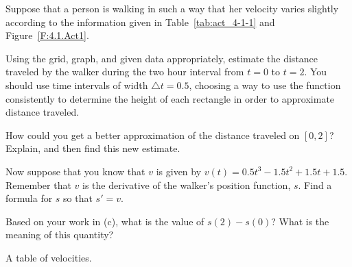 \begin{activity} \label{A:4.1.1}  Suppose that a person is walking in such a way that her velocity varies slightly according to the information given in Table~\ref{tab:act_4-1-1} and Figure~\ref{F:4.1.Act1}.
\ba
	\item Using the grid, graph, and given data appropriately, estimate the distance traveled by the walker during the two hour interval from $t = 0$ to $t = 2$.  You should use time intervals of width $\triangle t = 0.5$, choosing a way to use the function consistently to determine the height of each rectangle in order to approximate distance traveled.
	\item How could you get a better approximation of the distance traveled on $[0,2]$?  Explain, and then find this new estimate.
	\item Now suppose that you know that $v$ is given by $v(t) = 0.5t^3-1.5t^2+1.5t+1.5$. Remember that $v$ is the derivative of the walker's position function, $s$.  Find a formula for $s$ so that $s' = v$.
	\item Based on your work in (c), what is the value of $s(2) - s(0)$?  What is the meaning of this quantity? 
\ea
\end{activity}

\begin{margintable}[-10cm] %
\begin{center}
\end{center}
\caption{A table of velocities.}
\label{tab:act_4-1-1}
\end{margintable}

